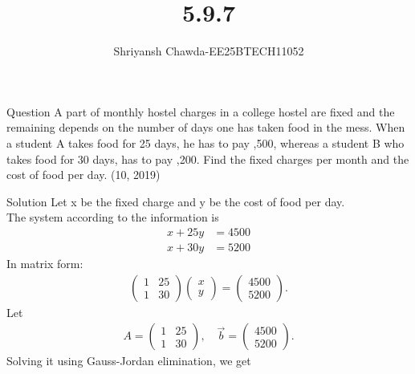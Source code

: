\documentclass{beamer}
\title{5.9.7}
\author{Shriyansh Chawda-EE25BTECH11052}
\newcommand{\myvec}[1]{\ensuremath{\begin{pmatrix}#1\end{pmatrix}}}
\begin{document}
	

		\frame{\titlepage}
	
	
\begin{frame}{Question} 
	A part of monthly hostel charges in a college hostel are fixed and the remaining depends on the number of days one has taken food in the mess. When a student A takes food for 25 days, he has to pay ,500, whereas a student B who takes food for 30 days, has to pay ,200. Find the fixed charges per month and the cost of
food per day.
\hfill{(10, 2019)}
\end{frame}
	
\begin{frame}{Solution}
Let x be the fixed charge and y be the cost of food per day.\\
The system according to the information is
\begin{align}
	x + 25y &= 4500 \\
	x + 30y &= 5200
\end{align}
In matrix form:
\begin{align}
	\myvec{1 & 25 \\ 1 & 30} \myvec{x \\ y} = \myvec{4500 \\ 5200}.
\end{align}
Let
\begin{align}
	A = \myvec{1 & 25 \\ 1 & 30}, \quad \vec{b} = \myvec{4500 \\ 5200}.
\end{align}
Solving it using Gauss-Jordan elimination, we get
\end{frame}
\end{document}
